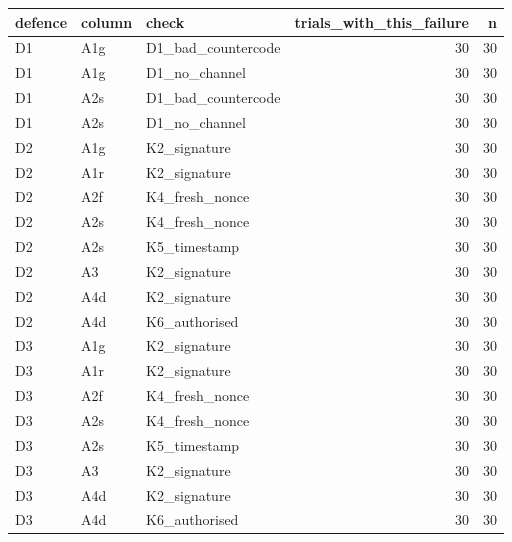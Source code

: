 \begin{tabular}{lllrr}
\toprule
defence & column & check & trials\_with\_this\_failure & n \\
\midrule
D1 & A1g & D1\_bad\_countercode & 30 & 30 \\
D1 & A1g & D1\_no\_channel & 30 & 30 \\
D1 & A2s & D1\_bad\_countercode & 30 & 30 \\
D1 & A2s & D1\_no\_channel & 30 & 30 \\
D2 & A1g & K2\_signature & 30 & 30 \\
D2 & A1r & K2\_signature & 30 & 30 \\
D2 & A2f & K4\_fresh\_nonce & 30 & 30 \\
D2 & A2s & K4\_fresh\_nonce & 30 & 30 \\
D2 & A2s & K5\_timestamp & 30 & 30 \\
D2 & A3 & K2\_signature & 30 & 30 \\
D2 & A4d & K2\_signature & 30 & 30 \\
D2 & A4d & K6\_authorised & 30 & 30 \\
D3 & A1g & K2\_signature & 30 & 30 \\
D3 & A1r & K2\_signature & 30 & 30 \\
D3 & A2f & K4\_fresh\_nonce & 30 & 30 \\
D3 & A2s & K4\_fresh\_nonce & 30 & 30 \\
D3 & A2s & K5\_timestamp & 30 & 30 \\
D3 & A3 & K2\_signature & 30 & 30 \\
D3 & A4d & K2\_signature & 30 & 30 \\
D3 & A4d & K6\_authorised & 30 & 30 \\
\bottomrule
\end{tabular}
